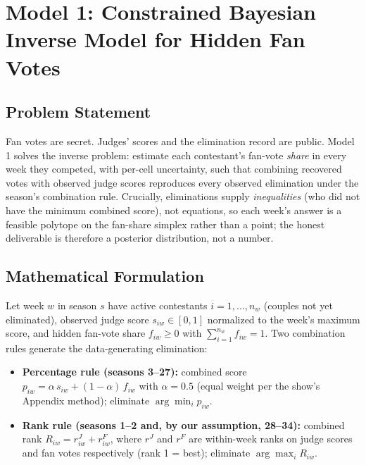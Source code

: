 \documentclass[11pt]{article}
\begin{document}
\section{Model 1: Constrained Bayesian Inverse Model for Hidden Fan Votes}
\label{sec:model1}

\subsection{Problem Statement}

Fan votes are secret. Judges' scores and the elimination record are
public. Model 1 solves the inverse problem: estimate each contestant's
fan-vote \emph{share} in every week they competed, with per-cell
uncertainty, such that combining recovered votes with observed judge
scores reproduces every observed elimination under the season's combination
rule. Crucially, eliminations supply \emph{inequalities} (who did not have
the minimum combined score), not equations, so each week's answer is a
feasible polytope on the fan-share simplex rather than a point; the honest
deliverable is therefore a posterior distribution, not a number.

\subsection{Mathematical Formulation}

Let week $w$ in season $s$ have active contestants $i = 1, \dots, n_w$
(couples not yet eliminated), observed judge score $s_{iw} \in [0,1]$
normalized to the week's maximum score, and hidden fan-vote share
$f_{iw} \ge 0$ with $\sum_{i=1}^{n_w} f_{iw} = 1$. Two combination rules
generate the data-generating elimination:

\begin{itemize}
\item \textbf{Percentage rule (seasons 3--27):} combined score
$p_{iw} = \alpha\, s_{iw} + (1-\alpha)\, f_{iw}$ with $\alpha = 0.5$
(equal weight per the show's Appendix method); eliminate
$\arg\min_i p_{iw}$.
\item \textbf{Rank rule (seasons 1--2 and, by our assumption, 28--34):}
combined rank $R_{iw} = r^{J}_{iw} + r^{F}_{iw}$, where $r^J$ and $r^F$
are within-week ranks on judge scores and fan votes respectively
(rank 1 = best); eliminate $\arg\max_i R_{iw}$.
\end{itemize}
\end{document}
